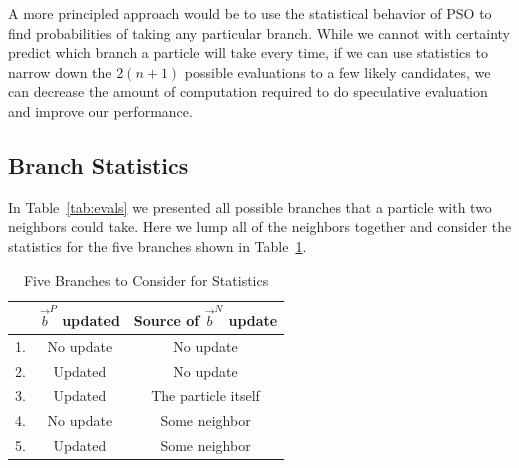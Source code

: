 \documentclass[journal,letterpaper]{IEEEtran}
\providecommand{\pers}{\ensuremath{P}}
\providecommand{\neigh}{\ensuremath{N}}
\providecommand{\nbest}{\ensuremath{\Vec{b}^\neigh}}
\providecommand{\pbest}{\ensuremath{\Vec{b}^\pers}}
\begin{document}
A more principled approach would be to use the statistical behavior of PSO to
find probabilities of taking any particular branch.  While we cannot with
certainty predict which branch a particle will take every time, if we can use
statistics to narrow down the $2(n+1)$ possible evaluations to a few likely
candidates, we can decrease the amount of computation required to do
speculative evaluation and improve our performance.

\subsection{Branch Statistics}

In Table~\ref{tab:evals} we presented all possible branches that a particle
with two neighbors could take.  Here we lump all of the neighbors together and
consider the statistics for the five branches shown in Table~\ref{tab:branches}.

\begin{table}[ht]
  \caption{Five Branches to Consider for Statistics}
  \label{tab:branches}
  \centering
  \begin{tabular}{rc|c}
	&$\pbest$ updated&Source of $\nbest$ update\\
	\hline
	1.&No update&No update\\
	2.&Updated&No update\\
	3.&Updated&The particle itself\\
	4.&No update&Some neighbor\\
	5.&Updated&Some neighbor\\
  \end{tabular}
\end{table}
\end{document}

